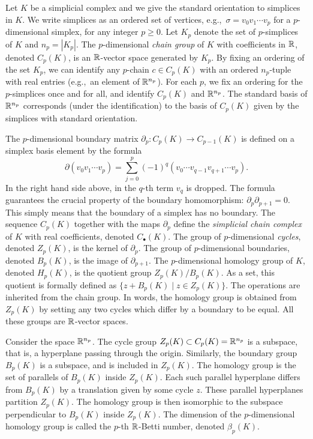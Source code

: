 \documentclass[10pt,a4paper]{amsart}
\newcommand {\mm}[1] {\ifmmode{#1}\else{\mbox{\(#1\)}}\fi}
\newcommand{\Rspace}        {\mm{\mathbb{R}}}
\theoremstyle{definition}
\theoremstyle{remark}
\begin{document}
Let $K$ be a simplicial complex and we give the standard orientation to simplices in $K$. We write simplices as an ordered set of vertices, e.g.,~$\sigma=v_0v_1\cdots v_{p}$ for a $p$-dimensional simplex, for any integer $p \geq 0$.
Let $K_p$ denote the set of $p$-simplices of $K$ and $n_p=|K_p|$. 
The $p$-dimensional \emph{chain group} of $K$ with coefficients in $\Rspace$, denoted $C_p(K)$, is an $\Rspace$-vector space generated by $K_p$. 
By fixing an ordering of the set $K_p$, we can identify any $p$-chain $c\in C_p(K)$ with an ordered $n_p$-tuple with real entries (e.g.,~an element of $\Rspace^{n_p}$).
For each $p$, we fix an ordering for the $p$-simplices once and for all, and identify $C_p(K)$ and $\Rspace^{n_p}$. 
The standard basis of $\Rspace^{n_p}$ corresponds (under the identification) to the basis of $C_p(K)$ given by the simplices with standard orientation.

The $p$-dimensional boundary matrix $\partial_p: C_p(K) \rightarrow C_{p-1}(K)$ is defined on a simplex basis element by the formula
\[ \partial (v_0v_1 \cdots v_p)= \sum_{j=0}^{p} {(-1)^q (v_0\cdots v_{q-1}v_{q+1}\cdots v_p) }.\]
In the right hand side above, in the $q$-th term $v_q$ is dropped. The formula guarantees the crucial property of the boundary homomorphism: $\partial_{p} \partial_{p+1} = 0$. This simply means that the boundary of a simplex has no boundary. The sequence $C_p(K)$ together with the maps $\partial_p$ define the \textit{simplicial chain complex} of $K$ with real coefficients, denoted $C_{\bullet}(K)$. The group of $p$-dimensional \textit{cycles}, denoted $Z_p(K)$, is the kernel of $\partial_p$. The group of $p$-dimensional boundaries, denoted $B_p(K)$, is the image of $\partial_{p+1}$. The $p$-dimensional homology group of $K$, denoted $H_p(K)$, is the quotient group $Z_p(K)/B_p(K)$. 
As a set, this quotient is formally defined as $\{z+B_p(K) \mid  z\in Z_p(K)\}$. The operations are inherited from the chain group. In words, the homology group is obtained from $Z_p(K)$ by setting any two cycles which differ by a boundary to be equal. All these groups are $\Rspace$-vector spaces.

Consider the space $\Rspace^{n_p}$. The cycle group $Z_p(K) \subset C_p(K) = \Rspace^{n_p}$ is a subspace, that is, a hyperplane passing through the origin. Similarly, the boundary group $B_p(K)$ is a subspace, and is included in $Z_p(K)$. The homology group is the set of parallels of $B_p(K)$ inside $Z_p(K)$. Each such parallel hyperplane differs from $B_p(K)$ by a translation given by some cycle $z$. These parallel hyperplanes partition $Z_p(K)$. The homology group is then isomorphic to the subspace perpendicular to $B_p(K)$ inside $Z_p(K)$. 
The dimension of the $p$-dimensional homology group is called the $p$-th $\Rspace$-Betti number, denoted $\beta_p(K)$. 
\end{document}
